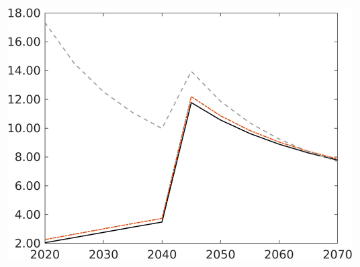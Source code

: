 \begin{figure}[h!!]
\begin{subfigure}{0.9\textwidth}
\begin{minipage}[]{0.32\textwidth}
\end{minipage}
\begin{minipage}[]{0.32\textwidth}
\includegraphics[width=1\textwidth]{../../codding_model/own_basedOnFried/optimalPol_010922_revision/figures/all_13Sept22/CompRed_TaulCalib_gAg_spillover0_knspil0_nsk0_xgr0_sep0_LFlimit1_emsbase0_countec0_GovRev0_etaa0.79_lgd0.png}
\end{minipage}
\end{subfigure}


\end{figure}
